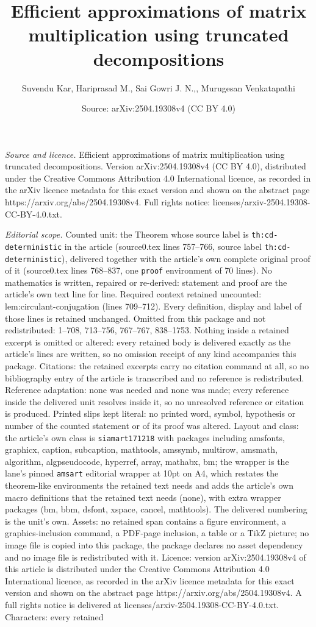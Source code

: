 \documentclass[10pt,a4paper]{amsart}
\title[Efficient approximations of matrix multiplication using trun]{Efficient approximations of matrix multiplication using truncated decompositions}
\author{Suvendu Kar, Hariprasad M., Sai Gowri J. N.,, Murugesan Venkatapathi}
\date{Source: arXiv:2504.19308v4 (CC BY 4.0)}
\begin{document}
\maketitle

\noindent\emph{Source and licence.} Efficient approximations of matrix multiplication using truncated decompositions. Version arXiv:2504.19308v4 (CC BY 4.0), distributed under the Creative Commons Attribution 4.0 International licence, as recorded in the arXiv licence metadata for this exact version and shown on the abstract page https://arxiv.org/abs/2504.19308v4. Full rights notice: licenses/arxiv-2504.19308-CC-BY-4.0.txt.\par\smallskip

\noindent\textit{Editorial scope.} Counted unit: the Theorem whose source label is \texttt{th:cd-deterministic} in the article (source0.tex lines 757--766, source label \texttt{th:cd-deterministic}), delivered together with the article's own complete original proof of it (source0.tex lines 768--837, one \texttt{proof} environment of 70 lines). No mathematics is written, repaired or re-derived: statement and proof are the article's own text line for line. Required context retained uncounted: lem:circulant-conjugation (lines 709--712). Every definition, display and label of those lines is retained unchanged. Omitted from this package and not redistributed: 1--708, 713--756, 767--767, 838--1753. Nothing inside a retained excerpt is omitted or altered: every retained body is delivered exactly as the article's lines are written, so no omission receipt of any kind accompanies this package. Citations: the retained excerpts carry no citation command at all, so no bibliography entry of the article is transcribed and no reference is redistributed. Reference adaptation: none was needed and none was made; every reference inside the delivered unit resolves inside it, so no unresolved reference or citation is produced. Printed slips kept literal: no printed word, symbol, hypothesis or number of the counted statement or of its proof was altered. Layout and class: the article's own class is \texttt{siamart171218} with packages including amsfonts, graphicx, caption, subcaption, mathtools, amssymb, multirow, amsmath, algorithm, algpseudocode, hyperref, array, mathabx, bm; the wrapper is the lane's pinned \texttt{amsart} editorial wrapper at 10pt on A4, which restates the theorem-like environments the retained text needs and adds the article's own macro definitions that the retained text needs (none), with extra wrapper packages (bm, bbm, dsfont, xspace, cancel, mathtools). The delivered numbering is the unit's own. Assets: no retained span contains a figure environment, a graphics-inclusion command, a PDF-page inclusion, a table or a TikZ picture; no image file is copied into this package, the package declares no asset dependency and no image file is redistributed with it. Licence: version arXiv:2504.19308v4 of this article is distributed under the Creative Commons Attribution 4.0 International licence, as recorded in the arXiv licence metadata for this exact version and shown on the abstract page https://arxiv.org/abs/2504.19308v4. A full rights notice is delivered at licenses/arxiv-2504.19308-CC-BY-4.0.txt. Characters: every retained 
\end{document}
